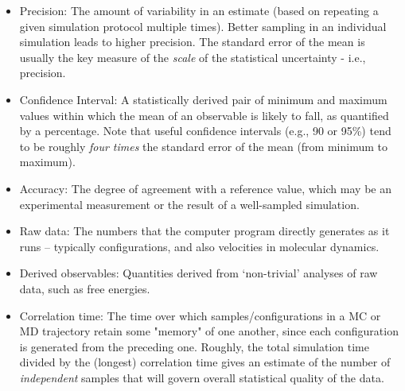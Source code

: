 \documentclass[9pt]{livecoms}
\begin{document}
\begin{itemize}
   \item Precision: The amount of variability in an estimate (based on repeating a given simulation protocol multiple times).
      Better sampling in an individual simulation leads to higher precision.
      The standard error of the mean is usually the key measure of the \emph{scale} of the statistical uncertainty - i.e., precision.
    \item Confidence Interval: A statistically derived pair of minimum and maximum values within which the mean of an observable is likely to fall, as quantified by a percentage.  Note that useful confidence intervals (e.g., 90 or 95\%) tend to be roughly \emph{four times} the standard error of the mean (from minimum to maximum).
    \item Accuracy: The degree of agreement with a reference value, which may be an experimental measurement or the result of a well-sampled simulation.
    \item Raw data: The numbers that the computer program directly generates as it runs -- typically configurations, and also velocities in molecular dynamics.
    \item Derived observables:  Quantities derived from `non-trivial' analyses of raw data, such as free energies.
    \item Correlation time: The time over which samples/configurations in a MC or MD trajectory retain some "memory" of one another, since each configuration is generated from the preceding one.  Roughly, the total simulation time divided by the (longest) correlation time gives an estimate of the number of \emph{independent} samples that will govern overall statistical quality of the data.
\end{itemize}
\end{document}
